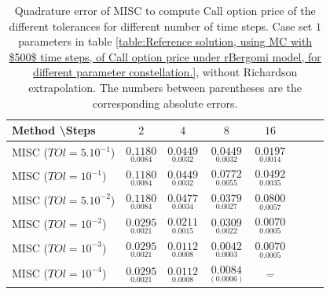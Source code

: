 \documentclass[11pt]{article}
\begin{document}
\begin{table}[h!]
	\centering
	\begin{tabular}{l*{6}{c}r}
		Method \textbackslash  Steps            & $2$ & $4$ & $8$ & $16$  \\
		\hline
		MISC ($TOl=5.10^{-1}$)  & $\underset{0.0084}{\mathbf{  0.1180}}$ & $\underset{0.0032
		}{\mathbf{0.0449
		}}$ & $\underset{0.0032}{\mathbf{0.0449}}$ & $\underset{0.0014}{\mathbf{0.0197}}$  \\
		MISC ($TOl=10^{-1}$)  & $\underset{0.0084}{\mathbf{  0.1180}}$ & $\underset{0.0032
		}{\mathbf{0.0449
		}}$ & $\underset{0.0055}{\mathbf{0.0772}}$ & $\underset{0.0035
		}{\mathbf{0.0492}}$  \\
		MISC ($TOl=5.10^{-2}$)  &$\underset{0.0084}{\mathbf{  0.1180}}$ & $\underset{0.0034}{\mathbf{0.0477}}$ & $\underset{0.0027}{\mathbf{0.0379
		}}$ & $\underset{0.0057}{\mathbf{0.0800}}$  \\
		MISC ($TOl=10^{-2}$)  & $\underset{ 0.0021
		}{\mathbf{0.0295}}$ & $\underset{0.0015}{\mathbf{0.0211}}$ & $\underset{0.0022
		}{\mathbf{0.0309
		}}$ & $\underset{0.0005}{\mathbf{0.0070}}$  \\
		MISC ($TOl=10^{-3}$)  & $\underset{ 0.0021
		}{\mathbf{0.0295}}$ & $\underset{0.0008}{\mathbf{ 0.0112}}$ & $\underset{0.0003
		}{\mathbf{0.0042
		}}$ & $\underset{0.0005}{\mathbf{ 0.0070}}$  \\
		MISC ($TOl=10^{-4}$)  & $\underset{ 0.0021
		}{\mathbf{0.0295}}$ & $\underset{0.0008}{\mathbf{ 0.0112}}$ & $\underset{(0.0006)
		}{\mathbf{0.0084
		}}$ & $\underset{-}{\mathbf{-}}$  \\
		\hline
	\end{tabular}
	\caption{Quadrature error of MISC to compute Call option price of the different tolerances for different number of time steps. Case  set $1$ parameters in table \ref{table:Reference solution, using MC with $500$ time steps, of Call option price under rBergomi model, for different parameter constellation.}, without Richardson extrapolation. The numbers between parentheses are the corresponding absolute errors.}
	\label{Quadrature error of MISC to compute Call option price of the different tolerances for different number of time steps. Case  set $1$ parameters, without Richardson extrapolation. The numbers between parentheses are the corresponding absolute errors.}
\end{table}
\end{document}
